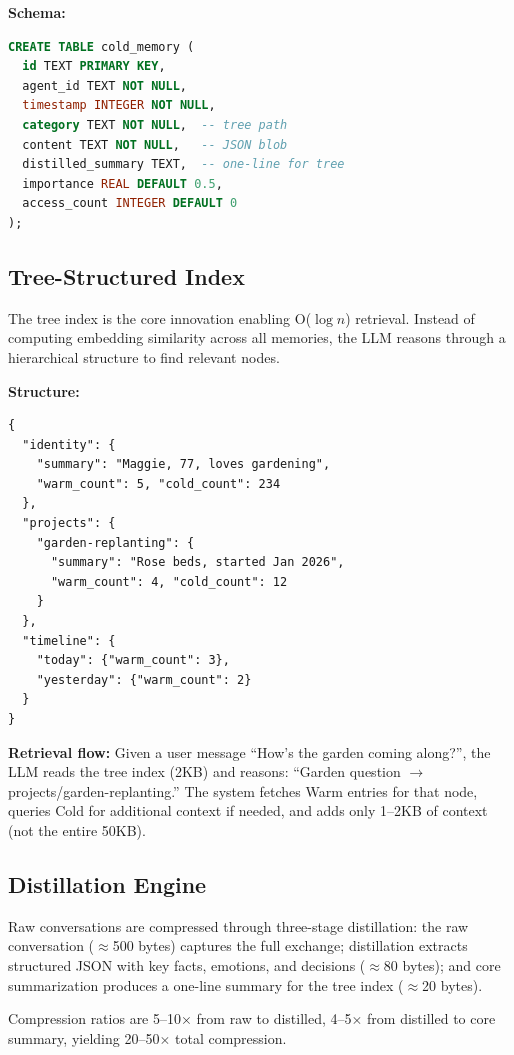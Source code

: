 \documentclass[conference]{IEEEtran}
\begin{document}
\textbf{Schema:}
\begin{lstlisting}[style=rustcode, language=SQL]
CREATE TABLE cold_memory (
  id TEXT PRIMARY KEY,
  agent_id TEXT NOT NULL,
  timestamp INTEGER NOT NULL,
  category TEXT NOT NULL,  -- tree path
  content TEXT NOT NULL,   -- JSON blob
  distilled_summary TEXT,  -- one-line for tree
  importance REAL DEFAULT 0.5,
  access_count INTEGER DEFAULT 0
);
\end{lstlisting}

\subsection{Tree-Structured Index}

The tree index is the core innovation enabling O($\log n$) retrieval. Instead of computing embedding similarity across all memories, the LLM reasons through a hierarchical structure to find relevant nodes.

\textbf{Structure:}
\begin{lstlisting}[style=jsoncode]
{
  "identity": {
    "summary": "Maggie, 77, loves gardening",
    "warm_count": 5, "cold_count": 234
  },
  "projects": {
    "garden-replanting": {
      "summary": "Rose beds, started Jan 2026",
      "warm_count": 4, "cold_count": 12
    }
  },
  "timeline": {
    "today": {"warm_count": 3},
    "yesterday": {"warm_count": 2}
  }
}
\end{lstlisting}

\textbf{Retrieval flow:} Given a user message ``How's the garden coming along?'', the LLM reads the tree index (2KB) and reasons: ``Garden question $\to$ projects/garden-replanting.'' The system fetches Warm entries for that node, queries Cold for additional context if needed, and adds only 1--2KB of context (not the entire 50KB).

\subsection{Distillation Engine}

Raw conversations are compressed through three-stage distillation: the raw conversation ($\approx$500 bytes) captures the full exchange; distillation extracts structured JSON with key facts, emotions, and decisions ($\approx$80 bytes); and core summarization produces a one-line summary for the tree index ($\approx$20 bytes).

Compression ratios are 5--10$\times$ from raw to distilled, 4--5$\times$ from distilled to core summary, yielding 20--50$\times$ total compression.
\end{document}
